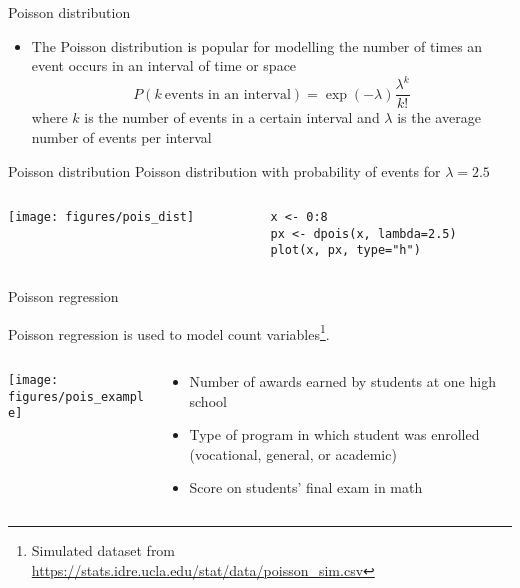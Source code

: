 \documentclass[aspectratio=169]{beamer}
\begin{document}
\begin{frame}{Poisson distribution}
\begin{itemize}
  \item The Poisson distribution is popular for modelling the number of
    times an event occurs in an interval of time or space
\[
  P(k~\text{events in an interval}) = \exp(-\lambda)\frac{\lambda^k}{k!}
\]
where $k$ is the number of events in a certain interval and $\lambda$ is
the average number of events per interval
\end{itemize}
\end{frame}

\begin{frame}[fragile]{Poisson distribution}
  Poisson distribution with probability of events for $\lambda = 2.5$\\[2ex]

\begin{columns}[c]
\begin{column}{6cm}
  \texttt{[image: figures/pois\_dist]}
\end{column}
\begin{column}{5cm}
  \begin{lstlisting}[style=plain]
x <- 0:8
px <- dpois(x, lambda=2.5)
plot(x, px, type="h")
\end{lstlisting}
\end{column}
\end{columns}
\end{frame}

\begin{frame}{Poisson regression}
  
Poisson regression is used to model count variables\footnote{Simulated dataset from
  \url{https://stats.idre.ucla.edu/stat/data/poisson_sim.csv}}.\\[2ex]
\begin{columns}[c]
\begin{column}{6cm}
  \texttt{[image: figures/pois\_example]}
\end{column}
\begin{column}{5cm}
  \begin{itemize}
    \item Number of awards earned by students at one high school
    \item Type of program in which student was enrolled (vocational,
    general, or academic)
    \item Score on students' final exam in math
  \end{itemize}
\end{column}
\end{columns}
\end{frame}
\end{document}
